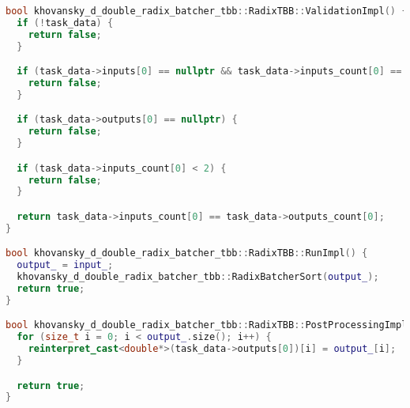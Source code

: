 \documentclass[12pt]{article}
\begin{document}
\begin{lstlisting}[language=C++,
    breaklines=true,       % Автоматический перенос строк
    columns=fullflexible ]
bool khovansky_d_double_radix_batcher_tbb::RadixTBB::ValidationImpl() {
  if (!task_data) {
    return false;
  }

  if (task_data->inputs[0] == nullptr && task_data->inputs_count[0] == 0) {
    return false;
  }

  if (task_data->outputs[0] == nullptr) {
    return false;
  }

  if (task_data->inputs_count[0] < 2) {
    return false;
  }

  return task_data->inputs_count[0] == task_data->outputs_count[0];
}

bool khovansky_d_double_radix_batcher_tbb::RadixTBB::RunImpl() {
  output_ = input_;
  khovansky_d_double_radix_batcher_tbb::RadixBatcherSort(output_);
  return true;
}

bool khovansky_d_double_radix_batcher_tbb::RadixTBB::PostProcessingImpl() {
  for (size_t i = 0; i < output_.size(); i++) {
    reinterpret_cast<double*>(task_data->outputs[0])[i] = output_[i];
  }

  return true;
}
\end{lstlisting}
\end{document}
